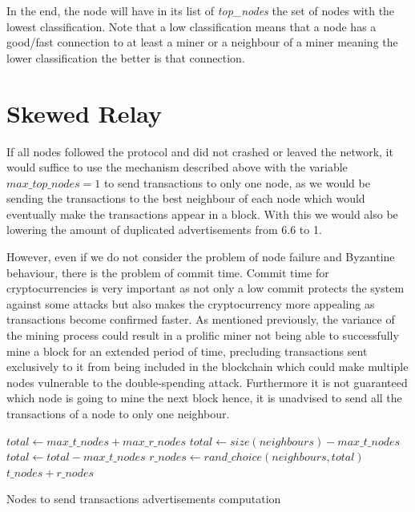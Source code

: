 In the end, the node will have in its list of \textsl{top\_nodes} the set of nodes with the lowest classification. Note that a low classification means that a node has a good/fast connection to at least a miner or a neighbour of a miner meaning the lower classification the better is that connection.

\section{Skewed Relay}
\label{sec:sr}

If all nodes followed the protocol and did not crashed or leaved the network, it would suffice to use the mechanism described above with the variable $max\_top\_nodes = 1$ to send
transactions to only one node, as we would be sending the transactions to the best neighbour of each node which would eventually make the transactions appear in a block. With this we would also be lowering the amount of duplicated advertisements from 6.6 to 1.

However, even if we do not consider the problem of node failure and Byzantine behaviour, there is the problem of commit time. Commit time for cryptocurrencies is very important as not only a low commit protects the system against some attacks but also makes the cryptocurrency more appealing as transactions become confirmed faster.
As mentioned previously, the variance of the mining process could result in a prolific miner not being able to successfully mine a block for an extended period of time, precluding transactions sent exclusively to it from being included in the blockchain which could make multiple nodes vulnerable to the double-spending attack. Furthermore it is not guaranteed which node is going to mine the next block hence, it is unadvised to send all the transactions of a node to only one neighbour.

\begin{algorithm}
\begin{algorithmic}[1]
\EndIf
\State $total \gets max\_t\_nodes + max\_r\_nodes$
	\State $total \gets size(neighbours) - max\_t\_nodes$
\Else
	\State $total \gets total - max\_t\_nodes$
    \EndIf
{}
	\State $r\_nodes \gets rand\_choice(neighbours, total)$
    \EndIf
\State \Return $t\_nodes + r\_nodes$
\EndFunction
\end{algorithmic}
\caption{Nodes to send transactions advertisements computation}
\label{alg:diss}
\end{algorithm}

